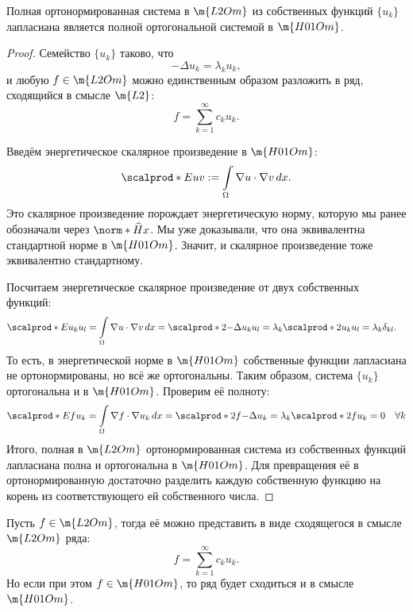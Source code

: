 \begin{theorem} Полная ортонормированная система в $\m{L2Om}$ из собственных функций $\{u_k\}$ лапласиана является полной ортогональной системой в $\m{H01Om}$.
\end{theorem}
\begin{proof} Семейство $\{ u_k \}$ таково, что
$$ - \Delta u_k = \lambda_k u_k,$$
и любую $f \in \m{L2Om}$ можно единственным образом разложить в ряд, сходящийся в смысле $\m{L2}$:
$$ f = \sum_{k=1}^\infty c_k u_k.$$

Введём энергетическое скалярное произведение в $\m{H01Om}$:
$$ \scalprod*{E}{u}{v} := \int \limits_\Omega \nabla u \cdot \nabla v \, dx.$$
Это скалярное произведение порождает энергетическую норму, которую мы ранее обозначали через $\norm*{\widehat{H}}{x}$. Мы уже доказывали, что она эквивалентна стандартной норме в $\m{H01Om}$. Значит, и скалярное произведение тоже эквивалентно стандартному.

Посчитаем энергетическое скалярное произведение от двух собственных функций:
\begin{align*}
\scalprod*{E}{u_k}{u_l} &= \int \limits_\Omega \nabla u \cdot \nabla v \, dx = \scalprod*{2}{-\Delta u_k}{u_l} = \lambda_k \scalprod*{2}{u_k}{u_l} = \lambda_k \delta_{kl}. 
\end{align*}
То есть, в энергетической норме в $\m{H01Om}$ собственные функции лапласиана не ортонормированы, но всё же ортогональны. Таким образом, система $\{ u_k \}$ ортогональна и в $\m{H01Om}$. Проверим её полноту:
\begin{align*}
\scalprod*{E}{f}{u_k} = \int \limits_\Omega \nabla f \cdot \nabla u_k \, dx = \scalprod*{2}{f}{- \Delta u_k} = \lambda_k \scalprod*{2}{f} {u_k} = 0 \quad \forall k
\end{align*}
Итого, полная в $\m{L2Om}$ ортонормированная система из собственных функций лапласиана полна и ортогональна в $\m{H01Om}$. Для превращения её в ортонормированную достаточно разделить каждую собственную функцию на корень из  соответствующего ей собственного числа.

\end{proof}

\begin{corollary} Пусть $f \in \m{L2Om}$, тогда её можно представить в виде сходящегося в смысле $\m{L2Om}$ ряда:
$$ f = \sum_{k=1}^\infty c_k u_k.$$ Но если при этом $f \in \m{H01Om}$, то ряд будет сходиться и в смысле $\m{H01Om}$.
\end{corollary}

